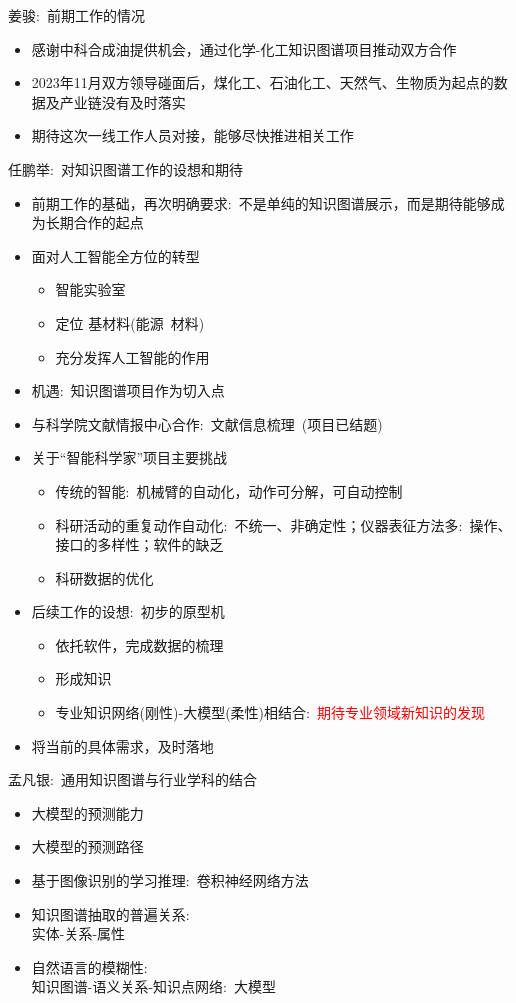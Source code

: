 {姜骏}:~前期工作的情况
\begin{itemize}
	\item 感谢中科合成油提供机会，通过化学-化工知识图谱项目推动双方合作
	\item 2023年11月双方领导碰面后，煤化工、石油化工、天然气、生物质为起点的数据及产业链没有及时落实
	\item 期待这次一线工作人员对接，能够尽快推进相关工作
\end{itemize}

{任鹏举}:~对知识图谱工作的设想和期待
\begin{itemize}
	\item 前期工作的基础，再次明确要求:~不是单纯的知识图谱展示，而是期待能够成为长期合作的起点
	\item 面对人工智能全方位的转型
		\begin{itemize}
			\item 智能实验室
			\item 定位 基材料(能源~材料)
			\item 充分发挥人工智能的作用
		\end{itemize}
	\item 机遇:~知识图谱项目作为切入点
	\item 与科学院文献情报中心合作:~文献信息梳理~(项目已结题)
	\item 关于“智能科学家”项目主要挑战
		\begin{itemize}
			\item 传统的智能:~机械臂的自动化，动作可分解，可自动控制
			\item 科研活动的重复动作自动化:~不统一、非确定性；仪器表征方法多:~操作、接口的多样性；软件的缺乏
			\item 科研数据的优化
		\end{itemize}
	\item 后续工作的设想:~初步的原型机
		\begin{itemize}
			\item 依托软件，完成数据的梳理
			\item 形成知识
			\item 专业知识网络(刚性)-大模型(柔性)相结合:~\textcolor{red}{期待专业领域新知识的发现}
		\end{itemize}
	\item 将当前的具体需求，及时落地
\end{itemize}

{孟凡银}:~通用知识图谱与行业学科的结合
\begin{itemize}
	\item 大模型的预测能力
	\item 大模型的预测路径
	\item 基于图像识别的学习推理:~卷积神经网络方法
	\item 知识图谱抽取的普遍关系:\\
		实体-关系-属性
	\item 自然语言的模糊性:\\
		知识图谱-语义关系-知识点网络:~大模型
\end{itemize}

